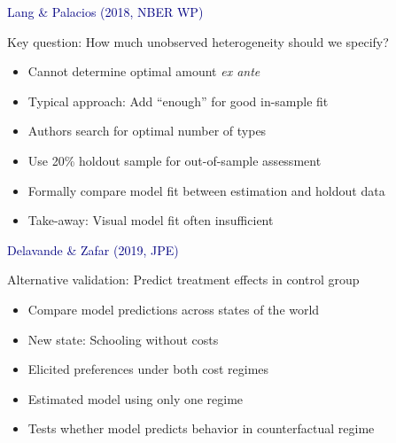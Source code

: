 \documentclass[aspectratio=169]{beamer}
\begin{document}
\begin{frame}

\textcolor{navy}{Lang \& Palacios (2018, NBER WP)}

\bigskip{}

Key question: How much unobserved heterogeneity should we specify?

\bigskip{}

\begin{itemize}
\itemsep1.5em
\item<2-> Cannot determine optimal amount \textit{ex ante}
\item<3-> Typical approach: Add ``enough'' for good in-sample fit
\item<4-> Authors search for optimal number of types
\item<5-> Use 20\% holdout sample for out-of-sample assessment
\item<6-> Formally compare model fit between estimation and holdout data
\item<7-> Take-away: Visual model fit often insufficient
\end{itemize}

\end{frame}

\begin{frame}

\textcolor{navy}{Delavande \& Zafar (2019, JPE)}

\bigskip{}

Alternative validation: Predict treatment effects in control group

\bigskip{}

\begin{itemize}
\itemsep1.5em
\item<2-> Compare model predictions across states of the world
\item<3-> New state: Schooling without costs
\item<4-> Elicited preferences under both cost regimes
\item<5-> Estimated model using only one regime
\item<6-> Tests whether model predicts behavior in counterfactual regime
\end{itemize}

\end{frame}
\end{document}
